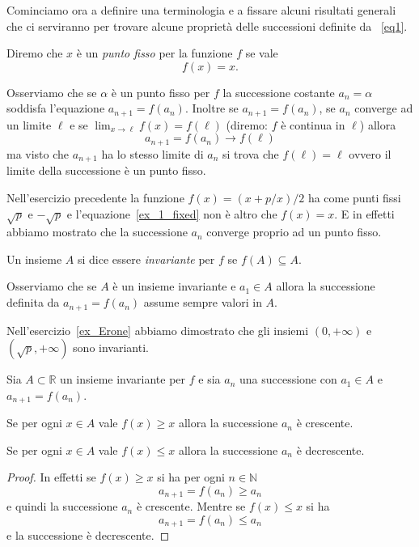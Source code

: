 \documentclass[italian,a4paper]{scrartcl}
\newcommand{\RR}{{\mathbb R}}
\newcommand{\NN}{{\mathbb N}}
\begin{document}
Cominciamo ora a definire una terminologia e a fissare alcuni
risultati generali che ci serviranno per trovare alcune proprietà
delle successioni definite da~ \eqref{eq1}.

\begin{definition}
  Diremo che $x$ è un \emph{punto fisso}
  per la funzione $f$ se vale
  \[
    f(x) = x.
  \]
\end{definition}
Osserviamo che se $\alpha$ è un punto fisso per $f$ la successione costante
$a_n=\alpha$ soddisfa l'equazione $a_{n+1} = f(a_n)$. Inoltre se
$a_{n+1} = f(a_n)$, se $a_n$ converge ad un limite $\ell$ e se
$\lim_{x\to \ell} f(x) = f(\ell)$ (diremo: $f$ è continua in $\ell$) allora
\[
a_{n+1} = f(a_n) \to f(\ell)
\]
ma visto che $a_{n+1}$ ha lo stesso limite di $a_n$ si trova che
$f(\ell)=\ell$ ovvero il limite della successione è un punto fisso.

Nell'esercizio precedente la funzione $f(x) = (x+p/x)/2$ ha come punti
fissi $\sqrt{p}$ e $-\sqrt{p}$ e l'equazione~\eqref{ex_1_fixed} non è
altro che $f(x)=x$. E in effetti abbiamo mostrato che la successione
$a_n$ converge proprio ad un punto fisso.

\begin{definition}
  Un insieme $A$ si dice essere \emph{invariante}
  per $f$ se
  $f(A)\subseteq A$.
\end{definition}

Osserviamo che se $A$ è un insieme invariante e $a_1\in A$ allora la
successione definita da $a_{n+1}=f(a_n)$ assume sempre valori in $A$.

Nell'esercizio~\ref{ex_Erone} abbiamo dimostrato che gli insiemi
$(0,+\infty)$ e $(\sqrt{p},+\infty)$ sono invarianti.

\begin{theorem}\label{th_1}
  Sia $A\subset \RR$ un insieme invariante per $f$ e sia $a_n$ una
  successione con $a_1 \in A$ e $a_{n+1}=f(a_n)$.

  Se per ogni $x\in A$
  vale $f(x) \ge x$
  allora la successione $a_n$ è crescente.

  Se per ogni $x\in A$ vale $f(x) \le x$
  allora la successione $a_n$ è decrescente.
\end{theorem}
\begin{proof}
  In effetti se $f(x) \ge x$ si ha per ogni $n\in \NN$
  \[
  a_{n+1} = f(a_n) \ge a_n
  \]
e quindi la successione $a_n$ è crescente. Mentre se $f(x) \le x$ si ha
  \[
  a_{n+1} = f(a_n) \le a_n
  \]
e la successione è decrescente.
\end{proof}
\end{document}
